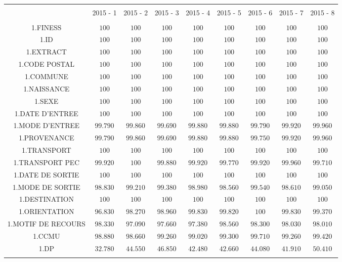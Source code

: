 \documentclass[]{article}
\begin{document}
\begin{table}[!htbp] \centering 
  \caption{} 
  \label{} 
\begin{tabular}{@{\extracolsep{5pt}} ccccccccc} 
\\[-1.8ex]\hline 
\hline \\[-1.8ex] 
 & 2015 - 1 & 2015 - 2 & 2015 - 3 & 2015 - 4 & 2015 - 5 & 2015 - 6 & 2015 - 7 & 2015 - 8 \\ 
\hline \\[-1.8ex] 
1.FINESS & $100$ & $100$ & $100$ & $100$ & $100$ & $100$ & $100$ & $100$ \\ 
1.ID & $100$ & $100$ & $100$ & $100$ & $100$ & $100$ & $100$ & $100$ \\ 
1.EXTRACT & $100$ & $100$ & $100$ & $100$ & $100$ & $100$ & $100$ & $100$ \\ 
1.CODE POSTAL & $100$ & $100$ & $100$ & $100$ & $100$ & $100$ & $100$ & $100$ \\ 
1.COMMUNE & $100$ & $100$ & $100$ & $100$ & $100$ & $100$ & $100$ & $100$ \\ 
1.NAISSANCE & $100$ & $100$ & $100$ & $100$ & $100$ & $100$ & $100$ & $100$ \\ 
1.SEXE & $100$ & $100$ & $100$ & $100$ & $100$ & $100$ & $100$ & $100$ \\ 
1.DATE D'ENTREE & $100$ & $100$ & $100$ & $100$ & $100$ & $100$ & $100$ & $100$ \\ 
1.MODE D'ENTREE & $99.790$ & $99.860$ & $99.690$ & $99.880$ & $99.880$ & $99.790$ & $99.920$ & $99.960$ \\ 
1.PROVENANCE & $99.790$ & $99.860$ & $99.690$ & $99.880$ & $99.880$ & $99.750$ & $99.920$ & $99.960$ \\ 
1.TRANSPORT & $100$ & $100$ & $100$ & $100$ & $100$ & $100$ & $100$ & $100$ \\ 
1.TRANSPORT PEC & $99.920$ & $100$ & $99.880$ & $99.920$ & $99.770$ & $99.920$ & $99.960$ & $99.710$ \\ 
1.DATE DE SORTIE & $100$ & $100$ & $100$ & $100$ & $100$ & $100$ & $100$ & $100$ \\ 
1.MODE DE SORTIE & $98.830$ & $99.210$ & $99.380$ & $98.980$ & $98.560$ & $99.540$ & $98.610$ & $99.050$ \\ 
1.DESTINATION & $100$ & $100$ & $100$ & $100$ & $100$ & $100$ & $100$ & $100$ \\ 
1.ORIENTATION & $96.830$ & $98.270$ & $98.960$ & $99.830$ & $99.820$ & $100$ & $99.830$ & $99.370$ \\ 
1.MOTIF DE RECOURS & $98.330$ & $97.090$ & $97.660$ & $97.380$ & $98.560$ & $98.300$ & $98.030$ & $98.010$ \\ 
1.CCMU & $98.880$ & $98.660$ & $99.260$ & $99.020$ & $99.300$ & $99.710$ & $99.260$ & $99.420$ \\ 
1.DP & $32.780$ & $44.550$ & $46.850$ & $42.480$ & $42.660$ & $44.080$ & $41.910$ & $50.410$ \\ 
\hline \\[-1.8ex] 
\end{tabular} 
\end{table}
\end{document}
